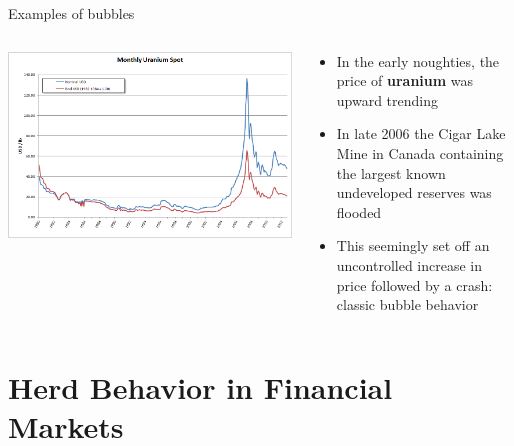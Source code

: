 \documentclass[english,10pt
,aspectratio=169
]{beamer}
\begin{document}
\begin{frame}{Examples of bubbles}
	\begin{columns}
		\begin{column}{0.55\linewidth}
			\center
			\includegraphics[width=\linewidth]{pics/Uranium}
		\end{column}
		\begin{column}{0.45\linewidth}
			\begin{itemize}
				\item In the early noughties, the price of \textbf{uranium} was upward trending
				\item In late 2006 the Cigar Lake Mine in Canada containing the largest known undeveloped reserves was flooded
				\item This seemingly set off an uncontrolled increase in price followed by a crash: classic bubble behavior
			\end{itemize}
		\end{column}
	\end{columns}
\end{frame}






\section{Herd Behavior in Financial Markets}
\end{document}
